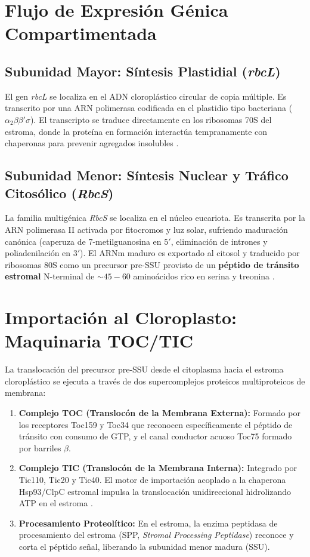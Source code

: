 \documentclass[12pt,spanish,letterpaper,oneside]{article}
\begin{document}
\section{Flujo de Expresión Génica Compartimentada}
\subsection{Subunidad Mayor: Síntesis Plastidial (\textit{rbcL})}
El gen \textit{rbcL} se localiza en el ADN cloroplástico circular de copia múltiple. Es transcrito por una ARN polimerasa codificada en el plastidio tipo bacteriana ($\alpha_2\beta\beta'\sigma$). El transcripto se traduce directamente en los ribosomas 70S del estroma, donde la proteína en formación interactúa tempranamente con chaperonas para prevenir agregados insolubles \parencite{alberts2015}.

\subsection{Subunidad Menor: Síntesis Nuclear y Tráfico Citosólico (\textit{RbcS})}
La familia multigénica \textit{RbcS} se localiza en el núcleo eucariota. Es transcrita por la ARN polimerasa II activada por fitocromos y luz solar, sufriendo maduración canónica (caperuza de 7-metilguanosina en $5'$, eliminación de intrones y poliadenilación en $3'$). El ARNm maduro es exportado al citosol y traducido por ribosomas 80S como un precursor pre-SSU provisto de un \textbf{péptido de tránsito estromal} N-terminal de $\sim 45-60$ aminoácidos rico en serina y treonina \parencite{lodish2016}.

\section{Importación al Cloroplasto: Maquinaria TOC/TIC}
La translocación del precursor pre-SSU desde el citoplasma hacia el estroma cloroplástico se ejecuta a través de dos supercomplejos proteicos multiproteicos de membrana:
\begin{enumerate}
    \item \textbf{Complejo TOC (Translocón de la Membrana Externa):} Formado por los receptores Toc159 y Toc34 que reconocen específicamente el péptido de tránsito con consumo de GTP, y el canal conductor acuoso Toc75 formado por barriles $\beta$.
    \item \textbf{Complejo TIC (Translocón de la Membrana Interna):} Integrado por Tic110, Tic20 y Tic40. El motor de importación acoplado a la chaperona Hsp93/ClpC estromal impulsa la translocación unidireccional hidrolizando ATP en el estroma \parencite{lodish2016}.
    \item \textbf{Procesamiento Proteolítico:} En el estroma, la enzima peptidasa de procesamiento del estroma (SPP, \textit{Stromal Processing Peptidase}) reconoce y corta el péptido señal, liberando la subunidad menor madura (SSU).
\end{enumerate}
\end{document}

